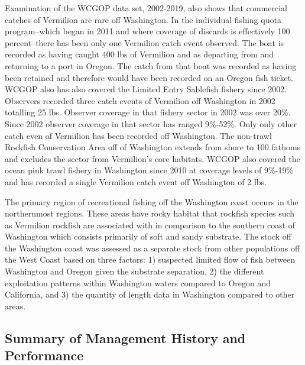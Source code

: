 \documentclass[11pt,
  english,
  a4paper,
]{article}
\begin{document}
Examination of the WCGOP data set, 2002-2019, also shows that commercial catches of Vermilion are rare off Washington. In the individual fishing quota program--which began in 2011 and where coverage of discards is effectively 100 percent--there has been only one Vermilion catch event observed. The boat is recorded as having caught 400 lbs of Vermilion and as departing from and returning to a port in Oregon. The catch from that boat was recorded as having been retained and therefore would have been recorded on an Oregon fish ticket. WCGOP also has also covered the Limited Entry Sablefish fishery since 2002. Observers recorded three catch events of Vermilion off Washington in 2002 totalling 25 lbs. Observer coverage in that fishery sector in 2002 was over 20\%. Since 2002 observer coverage in that sector has ranged 9\%-52\%. Only only other catch even of Vermilion has been recorded off Washington. The non-trawl Rockfish Conservation Area off of Washington extends from shore to 100 fathoms and excludes the sector from Vermilion's core habitats. WCGOP also covered the ocean pink trawl fishery in Washington since 2010 at coverage levels of 9\%-19\% and has recorded a single Vermilion catch event off Washington of 2 lbs.

\leavevmode\tagmcend\tagstructend\par


The primary region of recreational fishing off the Washington coast occurs in the northernmost regions. These areas have rocky habitat that rockfish species such as Vermilion rockfish are associated with in comparison to the southern coast of Washington which consists primarily of soft and sandy substrate. The stock off the Washington coast was assessed as a separate stock from other populations off the West Coast based on three factors: 1) suspected limited flow of fish between Washington and Oregon given the substrate separation, 2) the different exploitation patterns within Washington waters compared to Oregon and California, and 3) the quantity of length data in Washington compared to other areas.

\leavevmode\tagmcend\tagstructend\par


\hypertarget{summary-of-management-history-and-performance}{%
\subsection{Summary of Management History and Performance}\label{summary-of-management-history-and-performance}}
\end{document}
